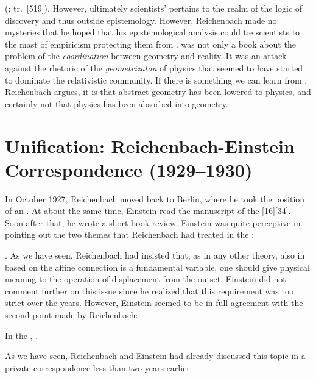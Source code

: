 \documentclass[draft]{article}
\renewcommand{\me}{;~m.e.{}}
\newcommand{\PRZL}{\citetitle{Reichenbach1928}\xspace}
\renewcommand{\rzlap}[2]{(\cite[#1]{Reichenbach1928}; tr.\ [#2])\xspace}
\begin{document}
 \rzlap{372}{519}. However, ultimately scientists'  pertains to the realm of the logic of discovery and thus outside epistemology. However, Reichenbach made no mysteries that he hoped that his epistemological analysis could tie scientists to the mast of empiricism protecting them from  \citep[373]{Reichenbach1928}. \PRZL was not only a book about the problem of the \emph{coordination} between geometry and reality. It was an attack against the rhetoric of the \emph{geometrizaton} of physics that seemed to have started to dominate the relativistic community. If there is something we can learn from \gr, Reichenbach argues, it is that abstract geometry has been lowered to physics, and certainly not that physics has been absorbed into geometry. 

\section{Unification: Reichenbach-Einstein Correspondence (1929--1930)}
\label{unification}
%
In October 1927, Reichenbach moved back to Berlin, where he took the position of an  \citep{Hecht1982}. At about the same time, Einstein read the manuscript of the \PRZL {}[16][34]. Soon after that, he wrote a short book review. Einstein was quite perceptive in pointing out the two themes that Reichenbach had treated in the \Ap: \begin{inparaenum}[(1)] \item {} \citep[20\me]{Einstein1928d}. As we have seen, Reichenbach had insisted that, as in any other theory, also in \uft based on the affine connection is a fundamental variable, one should give physical meaning to the operation of displacement from the outset. Einstein did not comment further on this issue since he realized that this requirement was too strict over the years. However, Einstein seemed to be in full agreement with the second point made by Reichenbach: \item In the \Ap,  \citep[20\me]{Einstein1928d}. \end{inparaenum} As we have seen, Reichenbach and Einstein had already discussed this topic in a private correspondence less than two years earlier . 
\end{document}
